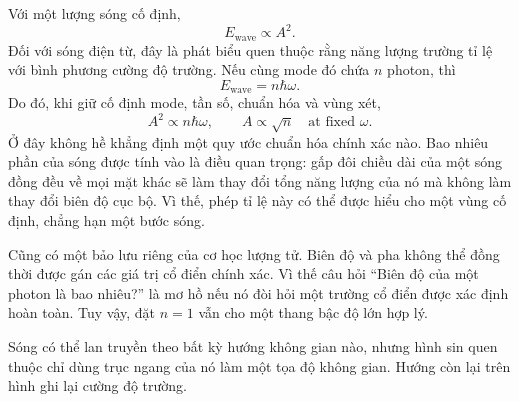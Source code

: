 Với một lượng sóng cố định,
\begin{equation}
E_{\text{wave}}\propto A^2.
\end{equation}
Đối với sóng điện từ, đây là phát biểu quen thuộc rằng năng lượng trường tỉ lệ với bình phương cường độ trường. Nếu cùng mode đó chứa \(n\) photon, thì
\begin{equation}
E_{\text{wave}}=n\hbar\omega.
\end{equation}
Do đó, khi giữ cố định mode, tần số, chuẩn hóa và vùng xét,
\begin{equation}
A^2\propto n\hbar\omega,
\qquad
A\propto\sqrt n\quad\text{at fixed }\omega.
\end{equation}
Ở đây không hề khẳng định một quy ước chuẩn hóa chính xác nào. Bao nhiêu phần của sóng được tính vào là điều quan trọng: gấp đôi chiều dài của một sóng đồng đều về mọi mặt khác sẽ làm thay đổi tổng năng lượng của nó mà không làm thay đổi biên độ cục bộ. Vì thế, phép tỉ lệ này có thể được hiểu cho một vùng cố định, chẳng hạn một bước sóng.

Cũng có một bảo lưu riêng của cơ học lượng tử. Biên độ và pha không thể đồng thời được gán các giá trị cổ điển chính xác. Vì thế câu hỏi ``Biên độ của một photon là bao nhiêu?'' là mơ hồ nếu nó đòi hỏi một trường cổ điển được xác định hoàn toàn. Tuy vậy, đặt \(n=1\) vẫn cho một thang bậc độ lớn hợp lý.

\begin{classroomqa}
\end{classroomqa}

Sóng có thể lan truyền theo bất kỳ hướng không gian nào, nhưng hình sin quen thuộc chỉ dùng trục ngang của nó làm một tọa độ không gian. Hướng còn lại trên hình ghi lại cường độ trường.

\begin{classroomqa}
\end{classroomqa}

